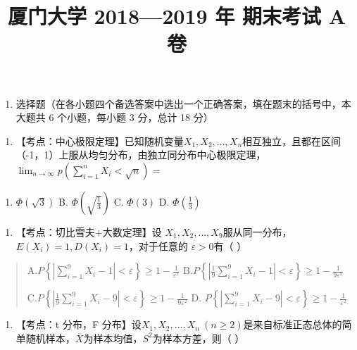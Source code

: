 \documentclass[fontset=exam]{exam-zh}
\title{厦门大学 2018—2019 年 期末考试 A 卷}
\begin{document}
\maketitle
{}
\begin{enumerate}
\item
  选择题（在各小题四个备选答案中选出一个正确答案，填在题末的括号中，本大题共 6 个小题，每小题 3 分，总计 18 分）
\end{enumerate}

\begin{enumerate}
\def\labelenumi{\arabic{enumi}.}
\item
  【考点：中心极限定理】已知随机变量\(X_1,X_2,\ldots,X_n\)相互独立，且都在区间（-1，1）上服从均匀分布，由独立同分布中心极限定理， \(\lim_{n\to\infty}p\left(\sum_{i=1}^n X_i<\sqrt n\right)=\)\underline{\hspace{2cm}}
\end{enumerate}

\begin{enumerate}
\def\labelenumi{\Alph{enumi}.}
\item
  \(\Phi(\sqrt3)\) B. \(\Phi\left(\sqrt{\frac13}\right)\) C. \(\Phi(3)\) D. \(\Phi\left(\frac13\right)\)
\end{enumerate}

\begin{enumerate}
\def\labelenumi{\arabic{enumi}.}
\setcounter{enumi}{1}
\item
  【考点：切比雪夫+大数定理】设 \(X_1,X_2,\ldots,X_9\)服从同一分布，\(E(X_i)=1,D(X_i)=1\)，对于任意的 \(\varepsilon>0\)有（ ）
\end{enumerate}

\begin{quote}
A.\(P\left\{\left|\sum_{i=1}^9X_i-1\right|<\varepsilon\right\}\geq1-\frac1{\varepsilon^2}\) B.\(P\left\{\left|\frac19\sum_{i=1}^9X_i-1\right|<\varepsilon\right\}\geq1-\frac1{9\varepsilon^2}\)

C.\(P\left\{\left|\frac19\sum_{i=1}^9X_i-9\right|<\varepsilon\right\}\geq1-\frac1{9\varepsilon^2}\) D. \(P\left\{\left|\sum_{i=1}^9X_i-9\right|<\varepsilon\right\}\geq1-\frac1{\varepsilon^2}\)
\end{quote}

\begin{enumerate}
\def\labelenumi{\arabic{enumi}.}
\setcounter{enumi}{2}
\item
  【考点：t 分布，F 分布】设\(X_1,X_2,\ldots,X_n\ (n\geq2)\)是来自标准正态总体的简单随机样本，\(\overline X\)为样本均值，\(S^2\)为样本方差，则（ ）
\end{enumerate}
\end{document}
